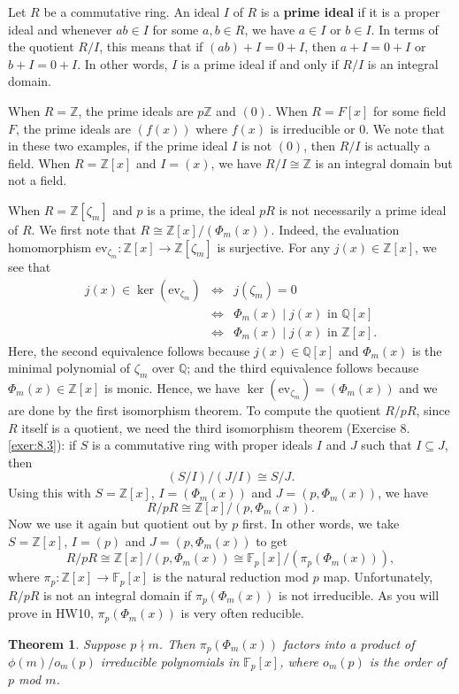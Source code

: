 \documentclass{article}
\def\Z{{\mathbb Z}}
\def\F{{\mathbb F}}
\def\Q{{\mathbb Q}}
\def\Z{{\mathbb Z}}
\def\F{{\mathbb F}}
\def\Q{{\mathbb Q}}
\newtheorem{theorem}[subsection]{Theorem}
\begin{document}
\vspace{5pt}
Let $R$ be a commutative ring. An ideal $I$ of $R$ is a \textbf{prime ideal} if it is a proper ideal and whenever $ab\in I$ for some $a,b\in R$, we have $a\in I$ or $b\in I$. In terms of the quotient $R/I$, this means that if $(ab) + I = 0 + I$, then $a + I = 0 + I$ or $b + I = 0 + I$. In other words, $I$ is a prime ideal if and only if $R/I$ is an integral domain.

When $R = \Z$, the prime ideals are $p\Z$ and $(0)$. When $R = F[x]$ for some field $F$, the prime ideals are $(f(x))$ where $f(x)$ is irreducible or $0$. We note that in these two examples, if the prime ideal $I$ is not $(0)$, then $R/I$ is actually a field. When $R = \Z[x]$ and $I = (x)$, we have $R/I \cong \Z$ is an integral domain but not a field.





When $R = \Z[\zeta_m]$ and $p$ is a prime, the ideal $pR$ is not necessarily a prime ideal of $R$. We first note that $R\cong \Z[x]/(\Phi_m(x))$. Indeed, the evaluation homomorphism $\text{ev}_{\zeta_m}:\Z[x]\rightarrow \Z[\zeta_m]$ is surjective. For any $j(x)\in\Z[x]$, we see that
\begin{eqnarray*}
    j(x)\in\ker(\text{ev}_{\zeta_m}) &\Leftrightarrow& j(\zeta_m) = 0\\
    &\Leftrightarrow& \Phi_m(x)\mid j(x)\mbox{ in }\Q[x]\\
    &\Leftrightarrow& \Phi_m(x)\mid j(x)\mbox{ in }\Z[x].
\end{eqnarray*}
Here, the second equivalence follows because $j(x)\in\Q[x]$ and $\Phi_m(x)$ is the minimal polynomial of $\zeta_m$ over $\Q$; and the third equivalence follows because $\Phi_m(x)\in\Z[x]$ is monic. Hence, we have $\ker(\text{ev}_{\zeta_m}) = (\Phi_m(x))$ and we are done by the first isomorphism theorem. To compute the quotient $R/pR$, since $R$ itself is a quotient, we need the third isomorphism theorem (Exercise 8.\ref{exer:8.3}): if $S$ is a commutative ring with proper ideals $I$ and $J$ such that $I\subseteq J$, then $$(S/I)/(J/I)\cong S/J.$$
Using this with $S = \Z[x]$, $I = (\Phi_m(x))$ and $J = (p, \Phi_m(x))$, we have
$$R/pR \cong \Z[x]/(p, \Phi_m(x)).$$
Now we use it again but quotient out by $p$ first. In other words, we take $S = \Z[x]$, $I = (p)$ and $J = (p, \Phi_m(x))$ to get
$$R/pR \cong \Z[x]/(p, \Phi_m(x))\cong \F_p[x]/(\pi_p(\Phi_m(x))),$$
where $\pi_p:\Z[x]\rightarrow\F_p[x]$ is the natural reduction mod $p$ map.
Unfortunately, $R/pR$ is not an integral domain if $\pi_p(\Phi_m(x))$ is not irreducible. As you will prove in HW10, $\pi_p(\Phi_m(x))$ is very often reducible.
\begin{theorem}
    Suppose $p\nmid m$. Then $\pi_p(\Phi_m(x))$ factors into a product of $\phi(m)/o_m(p)$ irreducible polynomials in $\F_p[x]$, where $o_m(p)$ is the order of $p$ mod $m$.
\end{theorem}
\end{document}
